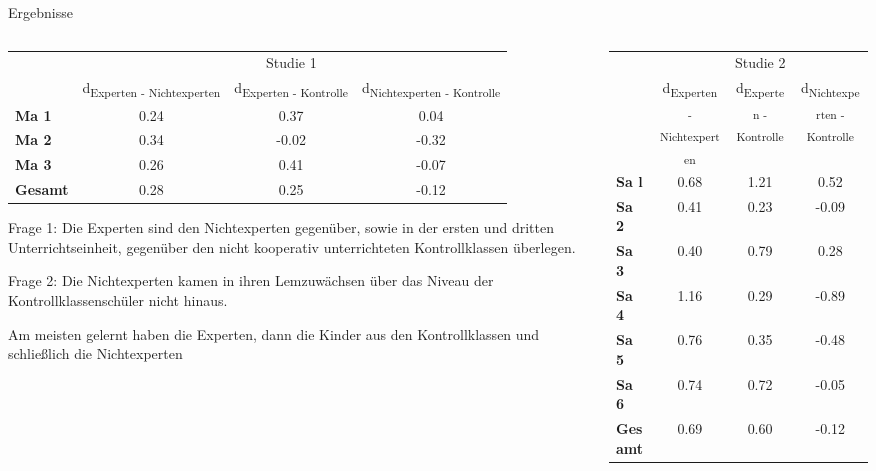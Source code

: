 \begin{block}{Ergebnisse} %
\begin{columns}[t,totalwidth=\twocolwid] %

\begin{column}{\onecolwid}
\begin{table}
\begin{tabular}{lccc}
 & \multicolumn{3}{c}{Studie 1} \\
\cmidrule{2-4}
 & d\textsubscript{Experten - Nichtexperten} & d\textsubscript{Experten - Kontrolle} & d\textsubscript{Nichtexperten - Kontrolle} \\
\midrule 
\textbf{Ma 1} & 0.24 & 0.37 & 0.04 \\
\textbf{Ma 2} & 0.34 & -0.02 & -0.32 \\
\textbf{Ma 3} & 0.26 & 0.41 & -0.07 \\
\midrule 
\textbf{Gesamt} & 0.28 & 0.25 & -0.12 \\
\bottomrule
\end{tabular}
\end{table}

\justifying 
Frage 1: Die Experten sind  den Nichtexperten gegenüber, sowie in der ersten und dritten Unterrichtseinheit, gegenüber den nicht kooperativ unterrichteten Kontrollklassen überlegen.
 
Frage 2: Die Nichtexperten kamen in ihren Lemzuwächsen über das Niveau 
der Kontrollklassenschüler nicht hinaus.

Am meisten gelernt haben die Experten, dann die Kinder aus den Kontrollklassen und schließlich die Nichtexperten
 
\end{column}

\begin{column}{\onecolwid}
\begin{table}
\begin{tabular}{lccc}
 & \multicolumn{3}{c}{Studie 2} \\
\cmidrule{2-4}
 & d\textsubscript{Experten - Nichtexperten} & d\textsubscript{Experten - Kontrolle} & d\textsubscript{Nichtexperten - Kontrolle} \\
\midrule 
\textbf{Sa l} & 0.68 & 1.21 & 0.52 \\
\textbf{Sa 2} & 0.41 & 0.23 & -0.09 \\
\textbf{Sa 3} & 0.40 & 0.79 & 0.28 \\
\textbf{Sa 4} & 1.16 & 0.29 & -0.89 \\
\textbf{Sa 5} & 0.76 & 0.35 & -0.48 \\
\textbf{Sa 6} & 0.74 & 0.72 & -0.05 \\
\midrule 
\textbf{Gesamt} & 0.69 & 0.60 & -0.12 \\
\bottomrule
\end{tabular} 
\end{table}


\end{column}
\end{columns}
\end{block}
